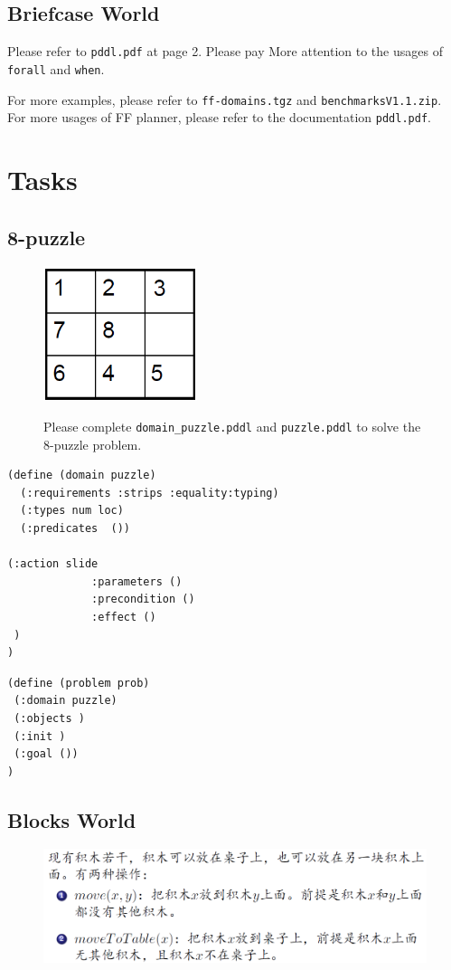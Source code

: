 ﻿\documentclass[a4paper, 11pt]{article}
\begin{document}
\subsection{Briefcase World}
Please refer to \texttt{pddl.pdf} at page 2. Please pay More attention to the usages of \texttt{forall} and \texttt{when}.

For more examples, please refer to \texttt{ff-domains.tgz} and \texttt{benchmarksV1.1.zip}. For more usages of FF planner, please refer to the documentation \texttt{pddl.pdf}.
\section{Tasks}

\subsection{8-puzzle}
\begin{figure}[H]
  \centering
  \includegraphics[width=0.4\textwidth]{fig/puzzle}
  \qquad
  \parbox[b]{0.4\textwidth}{Please complete  \texttt{domain\_puzzle.pddl} and \texttt{puzzle.pddl} to solve the 8-puzzle problem.\\}
\end{figure}
\begin{lstlisting}[title=domain\_puzzle.pddl,language=lisp]
(define (domain puzzle)
  (:requirements :strips :equality:typing)
  (:types num loc)
  (:predicates  ())

(:action slide
             :parameters ()
             :precondition ()
             :effect ()
 )
)
\end{lstlisting}
\begin{lstlisting}[title=domain\_puzzle.pddl,language=lisp]
(define (problem prob)
 (:domain puzzle)
 (:objects )
 (:init )
 (:goal ())
)
\end{lstlisting}

\subsection{Blocks World}
\begin{figure}[H]
  \centering
  \includegraphics[width=17cm]{fig/blocks}
\end{figure}
\end{document}
